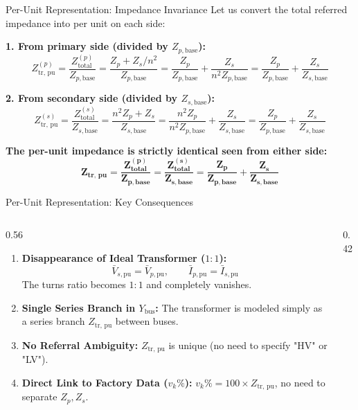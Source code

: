 \begin{frame}{Per-Unit Representation: Impedance Invariance}
Let us convert the total referred impedance into per unit on each side:

\textbf{1. From primary side (divided by $Z_{p, \text{base}}$):}
$$Z_{\text{tr, pu}}^{(p)} = \frac{Z_{\text{total}}^{(p)}}{Z_{p, \text{base}}} = \frac{Z_p + Z_s/n^2}{Z_{p, \text{base}}} = \frac{Z_p}{Z_{p, \text{base}}} + \frac{Z_s}{n^2 Z_{p, \text{base}}} = \frac{Z_p}{Z_{p, \text{base}}} + \frac{Z_s}{Z_{s, \text{base}}}$$

\textbf{2. From secondary side (divided by $Z_{s, \text{base}}$):}
$$Z_{\text{tr, pu}}^{(s)} = \frac{Z_{\text{total}}^{(s)}}{Z_{s, \text{base}}} = \frac{n^2 Z_p + Z_s}{Z_{s, \text{base}}} = \frac{n^2 Z_p}{n^2 Z_{p, \text{base}}} + \frac{Z_s}{Z_{s, \text{base}}} = \frac{Z_p}{Z_{p, \text{base}}} + \frac{Z_s}{Z_{s, \text{base}}}$$

\vspace{0.3em}
\begin{center}
    \alert{\textbf{The per-unit impedance is strictly identical seen from either side:}}
    $$\mathbf{Z_{\text{tr, pu}} = \frac{Z_{\text{total}}^{(p)}}{Z_{p, \text{base}}} = \frac{Z_{\text{total}}^{(s)}}{Z_{s, \text{base}}} = \frac{Z_p}{Z_{p, \text{base}}} + \frac{Z_s}{Z_{s, \text{base}}}}$$
\end{center}
\end{frame}

\begin{frame}{Per-Unit Representation: Key Consequences}
\begin{columns}[onlytextwidth]
\begin{column}{0.56\textwidth}
\small
\begin{enumerate}
    \item \textbf{Disappearance of Ideal Transformer ($1:1$):}
    $$\bar{V}_{s, \text{pu}} = \bar{V}_{p, \text{pu}}, \qquad \bar{I}_{p, \text{pu}} = \bar{I}_{s, \text{pu}}$$
    The turns ratio becomes $1:1$ and \alert{completely vanishes}.
    \item \textbf{Single Series Branch in $Y_{\text{bus}}$:}
    The transformer is modeled simply as a series branch $Z_{\text{tr, pu}}$ between buses.
    \item \textbf{No Referral Ambiguity:}
    $Z_{\text{tr, pu}}$ is unique (no need to specify "HV" or "LV").
    \item \textbf{Direct Link to Factory Data ($v_k\%$):}
    $v_k\% = 100 \times Z_{\text{tr, pu}}$, no need to separate $Z_p, Z_s$.
\end{enumerate}
\normalsize
\end{column}
\begin{column}{0.42\textwidth}
    \centering
    
\end{column}
\end{columns}
\end{frame}

